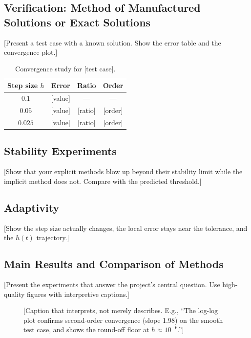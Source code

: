 \documentclass[11pt,a4paper]{article}
\theoremstyle{definition}
\theoremstyle{remark}
\begin{document}
\subsection{Verification: Method of Manufactured Solutions or Exact Solutions}
[Present a test case with a known solution. Show the error table and the
convergence plot.]

\begin{table}[H]
\centering
\begin{tabular}{cccc}
\toprule
\textbf{Step size $h$} & \textbf{Error} & \textbf{Ratio} & \textbf{Order} \\
\midrule
$0.1$    & [value] & ---  & ---  \\
$0.05$   & [value] & [ratio] & [order] \\
$0.025$  & [value] & [ratio] & [order] \\
\bottomrule
\end{tabular}
\caption{Convergence study for [test case].}
\end{table}

\subsection{Stability Experiments}
[Show that your explicit methods blow up beyond their stability limit while the
implicit method does not. Compare with the predicted threshold.]

\subsection{Adaptivity}
[Show the step size actually changes, the local error stays near the tolerance,
and the $h(t)$ trajectory.]

\subsection{Main Results and Comparison of Methods}
[Present the experiments that answer the project's central question. Use
high-quality figures with interpretive captions.]

\begin{figure}[H]
\centering
{}
\caption{[Caption that interprets, not merely describes. E.g., ``The log-log plot
confirms second-order convergence (slope 1.98) on the smooth test case, and shows
the round-off floor at $h \approx 10^{-6}$.'']}
\label{fig:convergence}
\end{figure}
\end{document}
